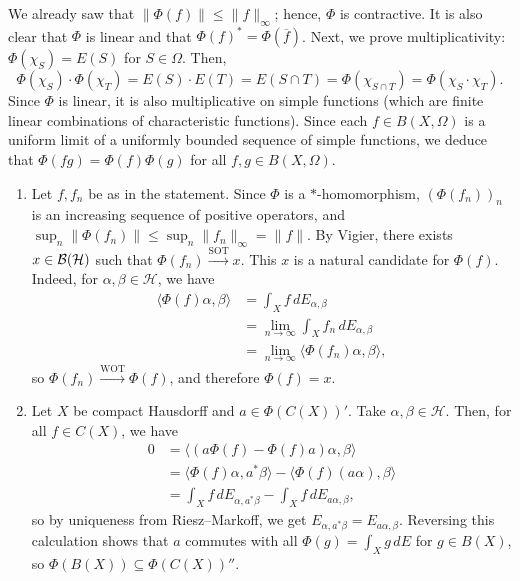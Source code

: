 \begin{myproof}
  We already saw that $\|\Phi (f)\| \leq \| f\|_{\infty}$; hence, $\Phi$ is contractive.
  It is also clear that $\Phi$ is linear and that $\Phi (f)^* = \Phi (\overline{f})$.
  Next, we prove multiplicativity: $\Phi (\chi_S) = E(S)$ for $S \in \Omega$.
  Then, 
  $$\Phi (\chi_S) \cdot \Phi (\chi_T) = E(S) \cdot E(T) = E(S \cap T) = \Phi (\chi_{S \cap T}) = \Phi (\chi_S \cdot \chi_T).$$
  Since $\Phi$ is linear, it is also multiplicative on simple functions (which are finite linear combinations of characteristic functions). 
  Since each $f \in B (X, \Omega)$ is a uniform limit of a uniformly bounded sequence of simple functions,
  we deduce that $\Phi (fg) = \Phi (f) \Phi (g)$ for all $f, g \in B (X, \Omega)$.
  \begin{enumerate}
    \item Let $f, f_n$ be as in the statement. Since $\Phi$ is a $*$-homomorphism,
    $(\Phi(f_n))_n$ is an increasing sequence of positive operators, and $\sup_n \| \Phi (f_n)\| \leq \sup_{n} \|f_n\|_{\infty} = \|f\|$.
    By Vigier, there exists $x \in \operatorname{\mathcal{B} (\mathcal{H})}$ such that $\Phi(f_n) \xrightarrow{\mathrm{SOT}} x$.
    This $x$ is a natural candidate for $\Phi(f)$. Indeed, for $\alpha, \beta \in \mathcal{H}$, we have 
    \begin{align*}
      \langle \Phi(f) \alpha, \beta\rangle &= \int_X f\, dE_{\alpha, \beta}\\
      &= \lim_{n \to \infty} \int_X f_n\, dE_{\alpha, \beta}\\
      &= \lim_{n \to \infty} \langle \Phi(f_n) \alpha, \beta\rangle,
    \end{align*}
    so $\Phi(f_n) \xrightarrow{\mathrm{WOT}} \Phi(f)$, and therefore $\Phi(f) = x$.
    \item Let $X$ be compact Hausdorff and $a \in \Phi(C(X))'$. Take $\alpha, \beta \in \mathcal{H}$.
    Then, for all $f \in C(X)$, we have 
    \begin{align*}
      0 &= \langle (a \Phi(f) - \Phi(f) a)\alpha, \beta\rangle\\
      &= \langle \Phi(f) \alpha, a^*\beta\rangle - \langle \Phi(f) (a\alpha), \beta\rangle\\
      &= \int_X f\, dE_{\alpha, a^* \beta} - \int_X f\, dE_{a\alpha, \beta},
    \end{align*}
    so by uniqueness from Riesz--Markoff, we get $E_{\alpha, a^* \beta} = E_{a\alpha,\beta}$.
    Reversing this calculation shows that $a$ commutes with all $\Phi(g) = \int_X g\, dE$ for $g \in B(X)$, so 
    $\Phi(B(X)) \subseteq \Phi(C(X))''$. \qedhere
  \end{enumerate}
\end{myproof}

